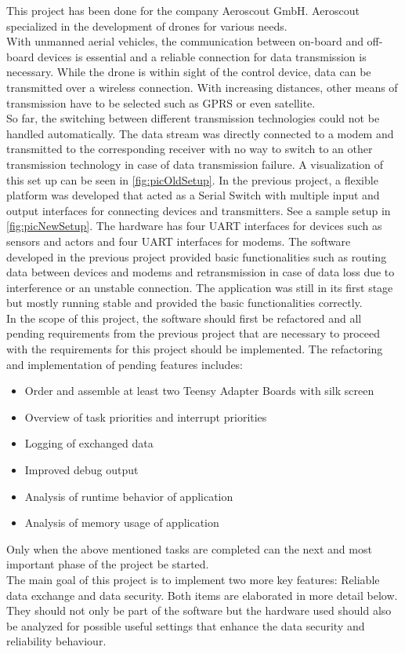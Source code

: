%
\label{sec:txtAufgabenstellung}
This project has been done for the company Aeroscout GmbH. Aeroscout specialized in the development of drones for various needs. \\
With unmanned aerial vehicles, the communication between on-board and off-board devices is essential and a reliable connection for data transmission is necessary. While the drone is within sight of the control device, data can be transmitted over a wireless connection. With increasing distances, other means of transmission have to be selected such as GPRS or even satellite.\\
So far, the switching between different transmission technologies could not be handled automatically. The data stream was directly connected to a modem and transmitted to the corresponding receiver with no way to switch to an other transmission technology in case of data transmission failure. A visualization of this set up can be seen in \autoref{fig:picOldSetup}.
%
%
In the previous project, a flexible platform was developed that acted as a Serial Switch with multiple input and output interfaces for connecting devices and transmitters. See a sample setup in \autoref{fig:picNewSetup}. The hardware has four UART interfaces for devices such as sensors and actors and four UART interfaces for modems. The software developed in the previous project provided basic functionalities such as routing data between devices and modems and retransmission in case of data loss due to interference or an unstable connection. The application was still in its first stage but mostly running stable and provided the basic functionalities correctly.\\
In the scope of this project, the software should first be refactored and all pending requirements from the previous project that are necessary to proceed with the requirements for this project should be implemented. The  refactoring and implementation of pending features includes: \begin{itemize}
    \item Order and assemble at least two Teensy Adapter Boards with silk screen
    \item Overview of task priorities and interrupt priorities
    \item Logging of exchanged data
    \item Improved debug output
    \item Analysis of runtime behavior of application
    \item Analysis of memory usage of application
\end{itemize}
Only when the above mentioned tasks are completed can the next and most important phase of the project be started.\\
The main goal of this project is to implement two more key features: Reliable data exchange and data security. Both items are elaborated in more detail below. They should not only be part of the software but the hardware used should also be analyzed for possible useful settings that enhance the data security and reliability behaviour.
%
%
%
